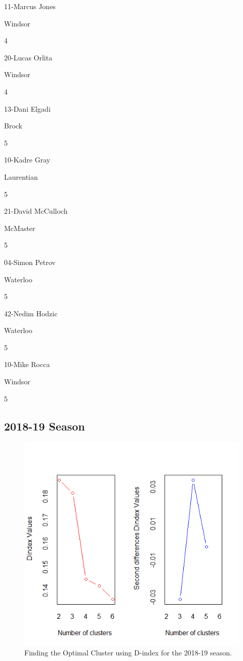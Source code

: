 \documentclass[]{book}
\begin{document}
11-Marcus Jones

Windsor

4

20-Lucas Orlita

Windsor

4

13-Dani Elgadi

Brock

5

10-Kadre Gray

Laurentian

5

21-David McCulloch

McMaster

5

04-Simon Petrov

Waterloo

5

42-Nedim Hodzic

Waterloo

5

10-Mike Rocca

Windsor

5

\hypertarget{season-3}{%
\subsection{2018-19 Season}\label{season-3}}

\begin{figure}
\centering
\includegraphics{images/Dindex3.png}
\caption{Finding the Optimal Cluster using D-index for the 2018-19 season.}
\end{figure}
\end{document}

